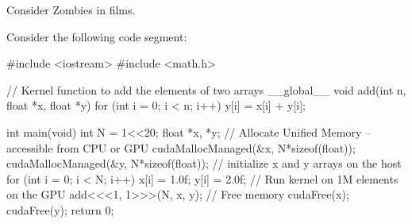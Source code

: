 \documentclass[a4paper,12pt,addpoints]{exam}
\begin{document}

Consider Zombies in films. 

\newpage


Consider the following code segment:

\begin{CUDA}
#include <iostream>
#include <math.h>

// Kernel function to add the elements of two arrays
__global__ void add(int n, float *x, float *y) {
  for (int i = 0; i < n; i++) y[i] = x[i] + y[i];
}

int main(void) {
  int N = 1<<20;
  float *x, *y;
  // Allocate Unified Memory – accessible from CPU or GPU
  cudaMallocManaged(&x, N*sizeof(float));
  cudaMallocManaged(&y, N*sizeof(float));
  // initialize x and y arrays on the host
  for (int i = 0; i < N; i++) x[i] = 1.0f; y[i] = 2.0f;
  // Run kernel on 1M elements on the GPU
  add<<<1, 1>>>(N, x, y);
  // Free memory
  cudaFree(x); cudaFree(y);
  return 0;
}
\end{CUDA}
\end{document}
